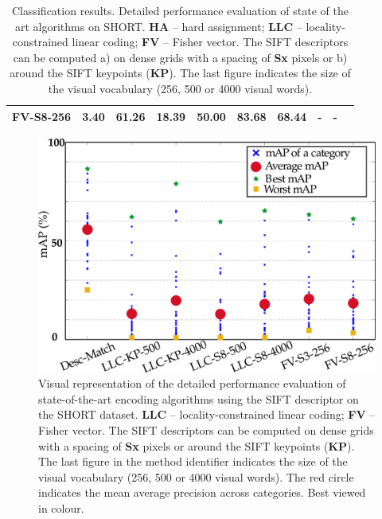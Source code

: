 \begin{table}
\begin{adjustbox}{max width=1.2\textwidth,center}
\begin{tabular}{cccccccccccccc}
\hline
FV-S8-256 & 3.40 & 61.26 &  18.39 & 50.00 & 83.68 & 68.44  & \multicolumn{3}{c}{-} & \multicolumn{3}{c}{-}\\
	\bottomrule
\end{tabular}
\end{adjustbox}
\caption{Classification results. Detailed performance evaluation of state of the art algorithms on SHORT. \textbf{HA} -- hard assignment; \textbf{LLC} -- locality-constrained linear coding; \textbf{FV} -- Fisher vector. The SIFT descriptors can be computed a) on dense grids with a spacing of \textbf{Sx} pixels or b) around the SIFT keypoints (\textbf{KP}). The last figure indicates the size of the visual vocabulary (256, 500 or 4000 visual words).}
\label{table:classification_results}
\end{table}

\begin{figure}[]
\begin{center}
\includegraphics[width=\linewidth]{./gfx/Chapter03/methods-v5.pdf}
\caption{Visual representation of the detailed performance evaluation of state-of-the-art encoding algorithms using the SIFT descriptor on the SHORT dataset. \textbf{LLC} -- locality-constrained linear coding; \textbf{FV} -- Fisher vector. The SIFT descriptors can be computed on dense grids with a spacing of \textbf{Sx} pixels or around the SIFT keypoints (\textbf{KP}). The last figure in the method identifier indicates the size of the visual vocabulary (256, 500 or 4000 visual words). The red circle indicates the mean average precision across categories. Best viewed in colour.}
\label{fig:methods}
\end{center}
\end{figure}



